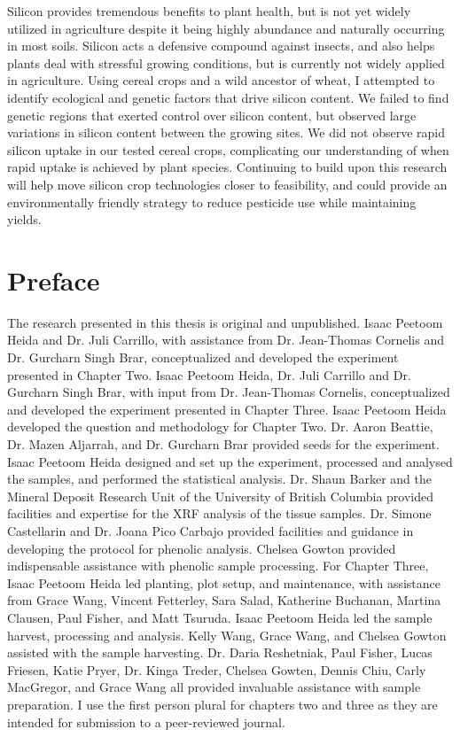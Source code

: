 \documentclass[12pt, letterpaper, ]{report}
\begin{document}
Silicon provides tremendous benefits to plant health, but is not yet widely utilized in agriculture despite it being highly abundance and naturally occurring in most soils. Silicon acts a defensive compound against insects, and also helps plants deal with stressful growing conditions, but is currently not widely applied in agriculture. Using cereal crops and a wild ancestor of wheat, I attempted to identify ecological and genetic factors that drive silicon content.  We failed to find genetic regions that exerted control over silicon content, but observed large variations in silicon content between the growing sites. We did not observe rapid silicon uptake in our tested cereal crops, complicating our understanding of when rapid uptake is achieved by plant species. Continuing to build upon this research will help move silicon crop technologies closer to feasibility, and could provide an environmentally friendly strategy to reduce pesticide use while maintaining yields.

\chapter*{Preface}

The research presented in this thesis is original and unpublished. Isaac Peetoom Heida and Dr. Juli Carrillo, with assistance from Dr. Jean-Thomas Cornelis and Dr. Gurcharn Singh Brar, conceptualized and developed the experiment presented in Chapter Two. Isaac Peetoom Heida, Dr. Juli Carrillo and Dr. Gurcharn Singh Brar, with input from Dr. Jean-Thomas Cornelis, conceptualized and developed the experiment presented in Chapter Three.
Isaac Peetoom Heida developed the question and methodology for Chapter Two. Dr. Aaron Beattie, Dr. Mazen Aljarrah, and Dr. Gurcharn Brar provided seeds for the experiment. Isaac Peetoom Heida designed and set up the experiment, processed and analysed the samples, and performed the statistical analysis. Dr. Shaun Barker and the Mineral Deposit Research Unit of the University of British Columbia provided facilities and expertise for the XRF analysis of the tissue samples. Dr. Simone Castellarin and Dr. Joana Pico Carbajo provided facilities and guidance in developing the protocol for phenolic analysis. Chelsea Gowton provided indispensable assistance with phenolic sample processing. 
For Chapter Three, Isaac Peetoom Heida led planting, plot setup, and maintenance, with assistance from Grace Wang, Vincent Fetterley, Sara Salad, Katherine Buchanan, Martina Clausen, Paul Fisher, and Matt Tsuruda. Isaac Peetoom Heida led the sample harvest, processing and analysis. Kelly Wang, Grace Wang, and Chelsea Gowton assisted with the sample harvesting. Dr. Daria Reshetniak, Paul Fisher, Lucas Friesen, Katie Pryer, Dr. Kinga Treder, Chelsea Gowten, Dennis Chiu, Carly MacGregor, and Grace Wang all provided invaluable assistance with sample preparation. 
I use the first person plural for chapters two and three as they are intended for submission to a peer-reviewed journal. 
\end{document}
